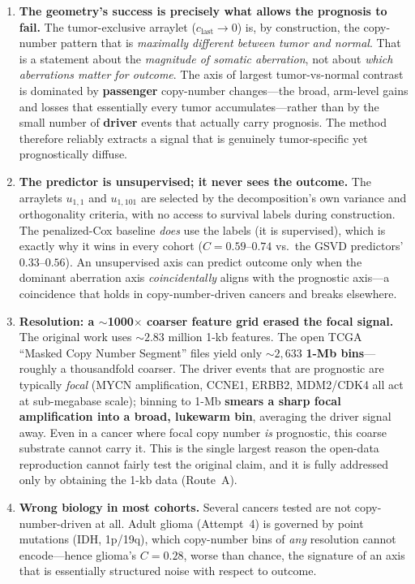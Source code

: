 \documentclass[11pt]{article}
\begin{document}
\begin{enumerate}[leftmargin=*]
  \item \textbf{The geometry's success is precisely what allows the prognosis to
    fail.} The tumor-exclusive arraylet ($c_{\text{last}} \to 0$) is, by
    construction, the copy-number pattern that is \emph{maximally different
    between tumor and normal}. That is a statement about the \emph{magnitude of
    somatic aberration}, not about \emph{which aberrations matter for outcome}.
    The axis of largest tumor-vs-normal contrast is dominated by \textbf{passenger}
    copy-number changes---the broad, arm-level gains and losses that essentially
    every tumor accumulates---rather than by the small number of \textbf{driver}
    events that actually carry prognosis. The method therefore reliably extracts
    a signal that is genuinely tumor-specific yet prognostically diffuse.

  \item \textbf{The predictor is unsupervised; it never sees the outcome.} The
    arraylets $u_{1,1}$ and $u_{1,101}$ are selected by the decomposition's own
    variance and orthogonality criteria, with no access to survival labels during
    construction. The penalized-Cox baseline \emph{does} use the labels (it is
    supervised), which is exactly why it wins in every cohort
    ($C = 0.59$--$0.74$ vs.\ the GSVD predictors' $0.33$--$0.56$). An unsupervised
    axis can predict outcome only when the dominant aberration axis
    \emph{coincidentally} aligns with the prognostic axis---a coincidence that
    holds in copy-number-driven cancers and breaks elsewhere.

  \item \textbf{Resolution: a $\sim$1000$\times$ coarser feature grid erased the
    focal signal.} The original work uses $\sim 2.83$ million 1-kb features. The
    open TCGA ``Masked Copy Number Segment'' files yield only $\sim 2{,}633$
    \textbf{1-Mb bins}---roughly a thousandfold coarser. The driver events that
    are prognostic are typically \emph{focal} (MYCN amplification, CCNE1, ERBB2,
    MDM2/CDK4 all act at sub-megabase scale); binning to 1-Mb \textbf{smears a
    sharp focal amplification into a broad, lukewarm bin}, averaging the driver
    signal away. Even in a cancer where focal copy number \emph{is} prognostic,
    this coarse substrate cannot carry it. This is the single largest reason the
    open-data reproduction cannot fairly test the original claim, and it is fully
    addressed only by obtaining the 1-kb data (Route~A).

  \item \textbf{Wrong biology in most cohorts.} Several cancers tested are not
    copy-number-driven at all. Adult glioma (Attempt~4) is governed by point
    mutations (IDH, 1p/19q), which copy-number bins of \emph{any} resolution
    cannot encode---hence glioma's $C = 0.28$, worse than chance, the signature of
    an axis that is essentially structured noise with respect to outcome.
\end{enumerate}
\end{document}
